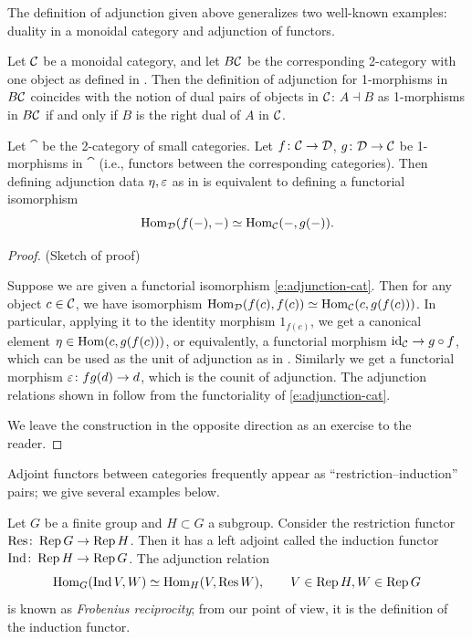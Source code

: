 The definition of adjunction given above generalizes two well-known examples:
duality in a monoidal category and adjunction of functors.

\begin{example}\label{x:adjunction-monoidal}
  Let $\mathcal{C}$ be a monoidal category, and let $B\mathcal{C}$ be the corresponding
  2-category with one object as defined in . Then the definition of
  adjunction for 1-morphisms in $B\mathcal{C}$ coincides with the notion of dual pairs
  of objects in $\mathcal{C}$: $A\dashv B$ as 1-morphisms in $B\mathcal{C}$ if and only if
  $B$ is the right dual of $A$ in $\mathcal{C}$.
\end{example}

\begin{theorem}\label{t:adjunction-cat}
  Let $\cat$ be the 2-category of small categories. Let $f\colon \mathcal{C}\to
  \mathcal{D}$, $g\colon \mathcal{D}\to \mathcal{C}$ be 1-morphisms in $\cat$ \textup{(}i.e., functors
  between the corresponding categories\textup{)}. Then defining adjunction data
  $\eta, \varepsilon$ as in  is equivalent to defining
  a functorial isomorphism
  \begin{equation}\label{e:adjunction-cat}
    \operatorname{Hom}_{\mathcal{D}}(f(-), -)\simeq \operatorname{Hom}_{\mathcal{C}}(-, g(-)).
  \end{equation}
\end{theorem}
\begin{proof}
  (Sketch of proof)

  Suppose we are given a functorial isomorphism \eqref{e:adjunction-cat}. Then
  for any object $c\in \mathcal{C}$, we have isomorphism $\operatorname{Hom}_{\mathcal{D}}(f(c),
  f(c))\simeq \operatorname{Hom}_{\mathcal{C}}(c, g(f(c)))$. In particular, applying it to the
  identity morphism $1_{f(c)}$, we get a canonical element $\eta\in \operatorname{Hom}(c,
  g(f(c)))$, or equivalently, a functorial morphism $\operatorname{id}_{\mathcal{C}}\to g\circ f$,
  which can be used as the unit of adjunction as in .
  Similarly we get a functorial morphism $\varepsilon\colon fg(d)\to d$, which is the
  counit of adjunction. The adjunction relations shown in
   follow from the functoriality of
  \eqref{e:adjunction-cat}.

  We leave the construction in the opposite direction as an exercise to the
  reader.

\end{proof}

Adjoint functors between categories frequently appear as
``restriction--induction'' pairs; we give several examples below.
\begin{example}\label{x:coset-bimodule}
  Let $G$ be a finite group and $H\subset G$ a subgroup. Consider the
  restriction functor $\operatorname{Res}\colon \operatorname{Rep} G\to \operatorname{Rep} H$. Then it has a left adjoint
  called the induction functor $\operatorname{Ind} \colon \operatorname{Rep} H\to \operatorname{Rep} G$. The adjunction
  relation
  $$
  \operatorname{Hom}_G(\operatorname{Ind} V, W)\simeq \operatorname{Hom}_H(V, \operatorname{Res} W), \qquad V\in \operatorname{Rep} H, W\in \operatorname{Rep} G
  $$
  is known as \emph{Frobenius reciprocity};
  from our point of view, it is the
  definition of the induction functor.
 \end{example}

